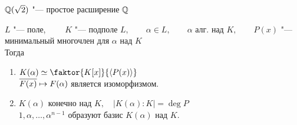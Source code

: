 \begin{eg}
	$ \mathbb{Q}(\sqrt2) $ "--- простое расширение $ \mathbb{Q} $
\end{eg}

\begin{theorem}
	$ L $ "--- поле, $ \qquad K $ "--- подполе $ L, \qquad \alpha \in L, \qquad \alpha $ алг. над $ K, \qquad P(x) $ "--- минимальный многочлен для $ \alpha $ над $ K $ \\
	Тогда
	\begin{enumerate}
		\item $ K(\alpha) \simeq \faktor{K[x]}{\braket{P(x)}} $ \\
		$ \overline{F(x)} \mapsto F(\alpha) $ является изоморфизмом.
		\item $ K(\alpha) $ конечно над $ K, \quad |K(\alpha) : K| = \deg P $ \\
		$ 1, \alpha, \dots, \alpha^{n - 1} $ образуют базис $ K(\alpha) $ над $ K $.
	\end{enumerate}
\end{theorem}

